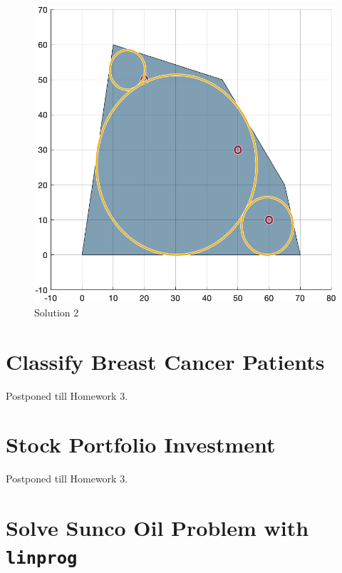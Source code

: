 \begin{figure}[h]
    \centering
    \includegraphics{hw2/prob1_plot2.png}
    \caption{Solution 2}
\end{figure}

\section{Classify Breast Cancer Patients}

Postponed till Homework 3.

\section{Stock Portfolio Investment}

Postponed till Homework 3.

\section{Solve Sunco Oil Problem with \texttt{linprog}}




